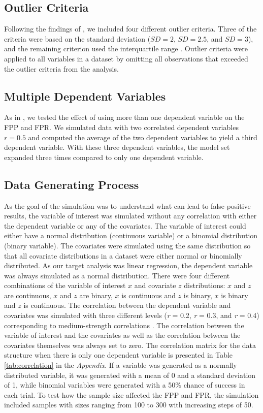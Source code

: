 



\subsection{Outlier Criteria}
Following the findings of \cite{Leyes2013}, we included four different outlier criteria. Three of the criteria were based on the standard deviation ($SD = 2$, $SD = 2.5$, and $SD = 3$), and the remaining criterion used the interquartile range \citep{Rousseeuw2011}. Outlier criteria were applied to all variables in a dataset by omitting all observations that exceeded the outlier criteria from the analysis.

\subsection{Multiple Dependent Variables}
As in \cite{Simmons2011}, we tested the effect of using more than one dependent variable on the FPP and FPR. We simulated data with two correlated dependent variables $r=0.5$ and computed the average of the two dependent variables to yield a third dependent variable. With these three dependent variables, the model set expanded three times compared to only one dependent variable. 

\subsection{Data Generating Process}
As the goal of the simulation was to understand what can lead to false-positive results, the variable of interest was simulated without any correlation with either the dependent variable or any of the covariates. The variable of interest could either have a normal distribution (continuous variable) or a binomial distribution (binary variable). The covariates were simulated using the same distribution so that all covariate distributions in a dataset were either normal or binomially distributed. As our target analysis was linear regression, the dependent variable was always simulated as a normal distribution. There were four different combinations of the variable of interest $x$ and covariate $z$ distributions: $x$ and $z$ are continuous, $x$ and $z$ are binary, $x$ is continuous and $z$ is binary, $x$ is binary and $z$ is continuous. The correlation between the dependent variable and covariates was simulated with three different levels (\textit{r} = 0.2, \textit{r} = 0.3, and \textit{r} = 0.4) corresponding to medium-strength correlations \citep{Cohen1989}. The correlation between the variable of interest and the covariates as well as the correlation between the covariates themselves was always set to zero. The correlation matrix for the data structure when there is only one dependent variable is presented in Table \ref{tab:correlation} in the \textit{Appendix}. If a variable was generated as a normally distributed variable, it was generated with a mean of 0 and a standard deviation of 1, while binomial variables were generated with a 50\% chance of success in each trial. To test how the sample size affected the FPP and FPR, the simulation included samples with sizes ranging from 100 to 300 with increasing steps of 50. 


